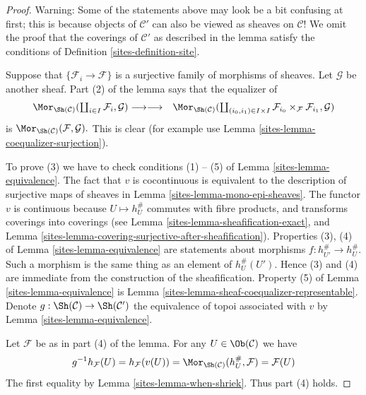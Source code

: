 \begin{proof}

Warning: Some of the statements above may look be a bit confusing at first;
this is because objects of $\mathcal{C}'$ can also be viewed as sheaves on
$\mathcal{C}$! We omit the proof that the coverings of $\mathcal{C}'$ as
described in the lemma satisfy the conditions of
Definition \ref{sites-definition-site}.

\medskip\noindent
Suppose that $\{\mathcal{F}_i \to \mathcal{F}\}$ is a surjective
family of morphisms of sheaves. Let $\mathcal{G}$ be another sheaf.
Part (2) of the lemma says that the equalizer of
$$
\begin{array}{cc}\Mor_{\Sh(\mathcal{C})}(
\coprod_{i \in I} \mathcal{F}_i, \mathcal{G})
\longrightarrow\longrightarrow & \Mor_{\Sh(\mathcal{C})}(
\coprod_{(i_0, i_1) \in I \times I}
\mathcal{F}_{i_0} \times_\mathcal{F} \mathcal{F}_{i_1}, \mathcal{G})\end{array}
$$
is $\Mor_{\Sh(\mathcal{C})}(\mathcal{F}, \mathcal{G}).$
This is clear (for example use Lemma \ref{sites-lemma-coequalizer-surjection}).

\medskip\noindent
To prove (3) we
have to check conditions (1) -- (5) of Lemma \ref{sites-lemma-equivalence}.
The fact that $v$ is cocontinuous is
equivalent to the description of surjective maps of sheaves in
Lemma \ref{sites-lemma-mono-epi-sheaves}.
The functor $v$ is continuous because
$U \mapsto h_U^\#$ commutes with fibre products,
and transforms coverings into coverings (see
Lemma \ref{sites-lemma-sheafification-exact}, and
Lemma \ref{sites-lemma-covering-surjective-after-sheafification}).
Properties (3), (4) of Lemma \ref{sites-lemma-equivalence}
are statements about morphisms $f : h_{U'}^\# \to h_U^\#$.
Such a morphism is the same thing as an element of $h_U^\#(U')$.
Hence (3) and (4) are immediate from the construction of the sheafification.
Property (5) of Lemma \ref{sites-lemma-equivalence} is
Lemma \ref{sites-lemma-sheaf-coequalizer-representable}.
Denote $g : \Sh(\mathcal{C}) \to \Sh(\mathcal{C}')$ the
equivalence of topoi associated with $v$ by Lemma \ref{sites-lemma-equivalence}.

\medskip\noindent
Let $\mathcal{F}$ be as in part (4) of the lemma.
For any $U \in \Ob(\mathcal{C})$ we have
$$
g^{-1}h_\mathcal{F}(U) = h_\mathcal{F}(v(U))
= \Mor_{\Sh(\mathcal{C})}(h_U^\#, \mathcal{F})
= \mathcal{F}(U)
$$
The first equality by
Lemma \ref{sites-lemma-when-shriek}.
Thus part (4) holds.


\end{proof}
